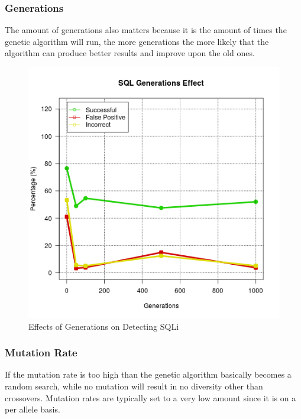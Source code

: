 \subsubsection{Generations}

The amount of generations also matters because it is the amount of times the genetic algorithm will run, the more generations the more likely that the algorithm can produce better results and improve upon the old ones.

\begin{figure}
	\label{fig:resGenerations}
	\includegraphics[width=450px]{./assets/results/ga/generations/Results_SQL.png}
	\caption{Effects of Generations on Detecting SQLi}
\end{figure}

\subsubsection{Mutation Rate}

If the mutation rate is too high than the genetic algorithm basically becomes a random search, while no mutation will result in no diversity other than crossovers.  Mutation rates are typically set to a very low amount since it is on a per allele basis. %

